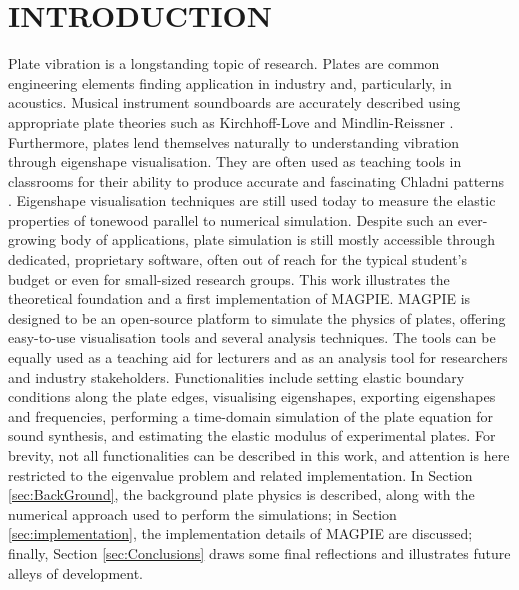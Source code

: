 \section{INTRODUCTION}
\noindent
Plate vibration is a longstanding topic of research. Plates are common engineering elements finding application in industry and, particularly, in acoustics. Musical instrument soundboards are accurately described using appropriate plate theories such as Kirchhoff-Love \cite{love_small_1888} and Mindlin-Reissner \cite{mindlin_Influence_1951}. Furthermore, plates lend themselves naturally to understanding vibration through eigenshape visualisation. They are often used as teaching tools in classrooms for their ability to produce accurate and fascinating Chladni patterns \cite{chladni_treatise_nodate}. Eigenshape visualisation techniques are still used today to measure the elastic properties of tonewood \cite{ducceschi_method_2024,fletcher_physics_2012} parallel to numerical simulation. Despite such an ever-growing body of applications, plate simulation is still mostly accessible through dedicated, proprietary software, often out of reach for the typical student's budget or even for small-sized research groups. This work illustrates the theoretical foundation and a first implementation of MAGPIE. MAGPIE is designed to be an open-source platform to simulate the physics of plates, offering easy-to-use visualisation tools and several analysis techniques. The tools can be equally used as a teaching aid for lecturers and as an analysis tool for researchers and industry stakeholders. Functionalities include setting elastic boundary conditions along the plate edges, visualising eigenshapes, exporting eigenshapes and frequencies, performing a time-domain simulation of the plate equation for sound synthesis, and estimating the elastic modulus of experimental plates. For brevity, not all functionalities can be described in this work, and attention is here restricted to the eigenvalue problem and related implementation. In Section \ref{sec:BackGround}, the background plate physics is described, along with the numerical approach used to perform the simulations; in Section \ref{sec:implementation}, the implementation details of MAGPIE are discussed; finally, Section \ref{sec:Conclusions} draws some final reflections and illustrates future alleys of development. 


